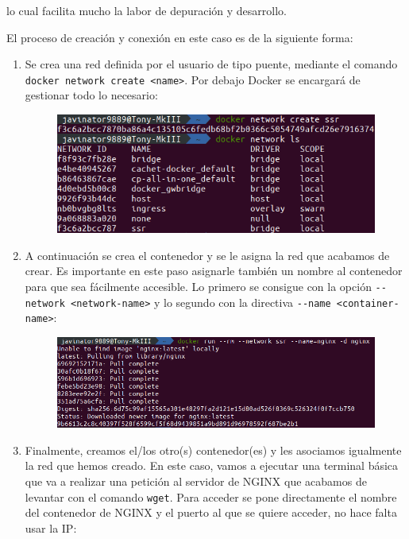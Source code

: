 \noindent lo cual facilita mucho la labor de depuración y desarrollo.

El proceso de creación y conexión en este caso es de la siguiente forma:

\begin{enumerate}
    \item Se crea una red definida por el usuario de tipo puente, mediante el
          comando \lstinline[style=bash]!docker network create <name>!. Por debajo
          Docker se encargará de gestionar todo lo necesario:

          \begin{figure}[H]
              \centering
              \includegraphics[width=.5\linewidth]{pictures/network-create.png}
          \end{figure}

    \item A continuación se crea el contenedor y se le asigna la red que acabamos
          de crear. Es importante en este paso asignarle también un nombre al
          contenedor para que sea fácilmente accesible. Lo primero se consigue
          con la opción \lstinline[style=bash]!--network <network-name>! y lo segundo
          con la directiva \lstinline[style=bash]!--name <container-name>!:
        
          \begin{figure}[H]
              \centering
              \includegraphics[width=.9\linewidth]{pictures/container-create.png}
          \end{figure}

    \item Finalmente, creamos el/los otro(s) contenedor(es) y les asociamos igualmente
          la red que hemos creado. En este caso, vamos a ejecutar una terminal
          básica que va a realizar una petición al servidor de NGINX que acabamos
          de levantar con el comando \texttt{wget}. Para acceder se pone directamente
          el nombre del contenedor de NGINX y el puerto al que se quiere acceder,
          no hace falta usar la IP:


\end{enumerate}
